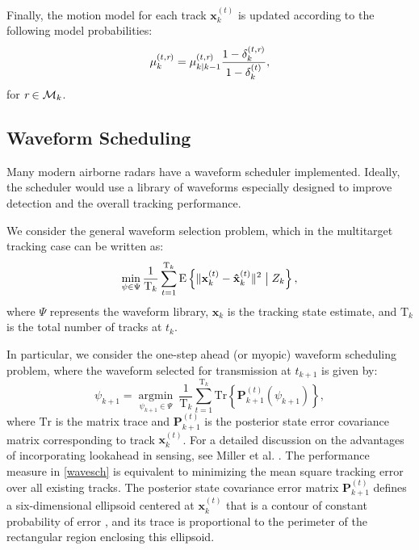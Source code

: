 \documentclass[times]{asjcauth}
\begin{document}
Finally, the motion model for each track $\mathbf{x}_{k}^{(t)}$ is updated according to the following model probabilities:
\begin{equation*}\label{eqmodelprob}
\mu_{k}^{(t,\emph{r})} = \mu_{k|k-1}^{(t,\emph{r})}\frac{1-\delta_{k}^{(t,\emph{r})}}{1-\delta_{k}^{(t)}},
\end{equation*}
\noindent for $\emph{r}\in\mathcal{M}_{k}$.

\subsection{Waveform Scheduling}\label{secschedule}

Many modern airborne radars have a waveform scheduler implemented. Ideally, the scheduler would use a library of waveforms especially designed to improve detection and the overall tracking performance.

We consider the general waveform selection problem, which in the multitarget tracking case can be written as:
\begin{equation*}
\min_{\psi\in\Psi}\frac{1}{\mathrm{T}_{k}}\sum_{t=1}^{\mathrm{T}_{k}}\mathrm{E}\left\{\| \mathbf{x}_{k}^{(t)} - \mathbf{\hat{x}}_{k}^{(t)} \|^{2} \bigm| Z_{k} \right\},
\end{equation*}
where $\Psi$ represents the waveform library, $\mathbf{\hat{x}}_{k}$ is the tracking state estimate, and $\mathrm{T}_{k}$ is the total number of tracks at $t_{k}$.

In particular, we consider the one-step ahead (or myopic) waveform scheduling problem, where the waveform selected for transmission at $t_{k+1}$ is given by:
\begin{equation}\label{wavesch}
\psi_{k+1} = \underset{\psi_{k+1}\in\Psi}{\operatorname{argmin}}~\frac{1}{\mathrm{T}_{k}}\sum_{t=1}^{\mathrm{T}_{k}}\mathrm{Tr}\left\{\mathbf{P}_{k+1}^{(t)}\left(\psi_{k+1}\right)\right\},
\end{equation}
\noindent where $\mathrm{Tr}$ is the matrix trace and $\mathbf{P}_{k+1}^{(t)}$ is the posterior state error covariance matrix corresponding to track $\mathbf{x}_{k}^{(t)}$. For a detailed discussion on the advantages of incorporating lookahead in sensing, see Miller et al. \cite{Numerica}. The performance measure in \eqref{wavesch} is equivalent to minimizing the mean square tracking error over all existing tracks. The posterior state covariance error matrix $\mathbf{P}_{k+1}^{(t)}$ defines a six-dimensional ellipsoid centered at $\mathbf{x}_{k}^{(t)}$ that is a contour of constant probability of error \cite{VanTrees}, and its trace is proportional to the perimeter of the rectangular region enclosing this ellipsoid.
\end{document}
